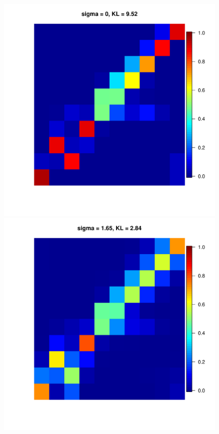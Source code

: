\documentclass[11pt, oneside]{article}   	%
\begin{document}
\begin{figure}[h!]
{\begin{minipage}[t]{.3\textwidth}
		\end{minipage}
		\hfill
		\begin{minipage}[t]{.3\textwidth}
			\centering
			\includegraphics[width=\textwidth]{figures/Pseudo_alpha1dot5N100n100run1sd0.pdf}
			
		\end{minipage} 
		\hfill
		\begin{minipage}[t]{.3\textwidth}
			\centering
			\includegraphics[width=\textwidth]{figures/Pseudo_alpha1dot5N100n100run1sd1dot65.pdf}
			

\end{minipage}}
\end{figure}
\end{document}
